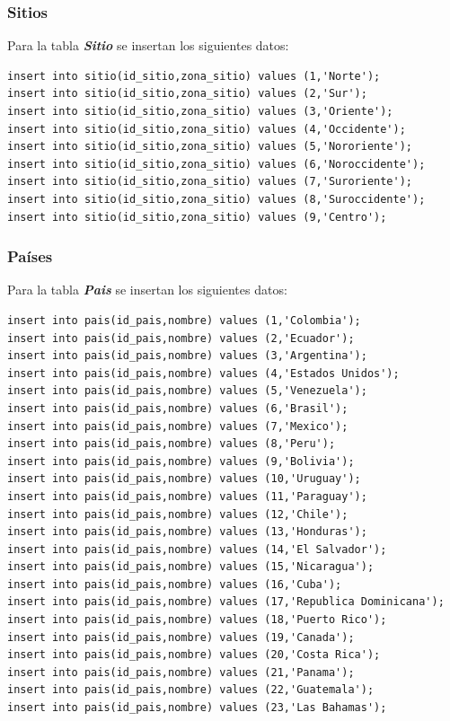 \documentclass{article}
\begin{document}
\subsubsection{Sitios}
Para la tabla \textit{\textbf{Sitio}} se insertan los siguientes datos:

\begin{lstlisting}
insert into sitio(id_sitio,zona_sitio) values (1,'Norte');
insert into sitio(id_sitio,zona_sitio) values (2,'Sur');
insert into sitio(id_sitio,zona_sitio) values (3,'Oriente');
insert into sitio(id_sitio,zona_sitio) values (4,'Occidente');
insert into sitio(id_sitio,zona_sitio) values (5,'Nororiente');
insert into sitio(id_sitio,zona_sitio) values (6,'Noroccidente');
insert into sitio(id_sitio,zona_sitio) values (7,'Suroriente');
insert into sitio(id_sitio,zona_sitio) values (8,'Suroccidente');
insert into sitio(id_sitio,zona_sitio) values (9,'Centro');
\end{lstlisting}

\subsubsection{Países}

Para la tabla \textit{\textbf{Pais}} se insertan los siguientes datos:

\begin{lstlisting}
insert into pais(id_pais,nombre) values (1,'Colombia');
insert into pais(id_pais,nombre) values (2,'Ecuador');
insert into pais(id_pais,nombre) values (3,'Argentina');
insert into pais(id_pais,nombre) values (4,'Estados Unidos');
insert into pais(id_pais,nombre) values (5,'Venezuela');
insert into pais(id_pais,nombre) values (6,'Brasil');
insert into pais(id_pais,nombre) values (7,'Mexico');
insert into pais(id_pais,nombre) values (8,'Peru');
insert into pais(id_pais,nombre) values (9,'Bolivia');
insert into pais(id_pais,nombre) values (10,'Uruguay');
insert into pais(id_pais,nombre) values (11,'Paraguay');
insert into pais(id_pais,nombre) values (12,'Chile');
insert into pais(id_pais,nombre) values (13,'Honduras');
insert into pais(id_pais,nombre) values (14,'El Salvador');
insert into pais(id_pais,nombre) values (15,'Nicaragua');
insert into pais(id_pais,nombre) values (16,'Cuba');
insert into pais(id_pais,nombre) values (17,'Republica Dominicana');
insert into pais(id_pais,nombre) values (18,'Puerto Rico');
insert into pais(id_pais,nombre) values (19,'Canada');
insert into pais(id_pais,nombre) values (20,'Costa Rica');
insert into pais(id_pais,nombre) values (21,'Panama');
insert into pais(id_pais,nombre) values (22,'Guatemala');
insert into pais(id_pais,nombre) values (23,'Las Bahamas');
\end{lstlisting}
\end{document}
